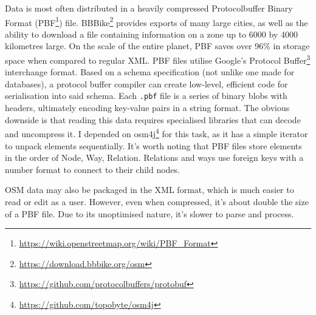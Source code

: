Data is most often distributed in a heavily compressed Protocolbuffer Binary Format (PBF\footnote{\url{https://wiki.openstreetmap.org/wiki/PBF_Format}}) file. BBBike\footnote{\url{https://download.bbbike.org/osm}} provides exports of many large cities, as well as the ability to download a file containing information on a zone up to 6000 by 4000 kilometres large. On the scale of the entire planet, PBF saves over 96\% in storage space when compared to regular XML. PBF files utilise Google's Protocol Buffer\footnote{\url{https://github.com/protocolbuffers/protobuf}} interchange format. Based on a schema specification (not unlike one made for databases), a protocol buffer compiler can create low-level, efficient code for serialisation into said schema. Each \verb|.pbf| file is a series of binary blobs with headers, ultimately encoding key-value pairs in a string format. The obvious downside is that reading this data requires specialised libraries that can decode and uncompress it. I depended on osm4j\footnote{\url{https://github.com/topobyte/osm4j}} for this task, as it has a simple iterator to unpack elements sequentially. It's worth noting that PBF files store elements in the order of Node, Way, Relation. Relations and ways use foreign keys with a number format to connect to their child nodes.

OSM data may also be packaged in the XML format, which is much easier to read or edit as a user. However, even when compressed, it's about double the size of a PBF file. Due to its unoptimised nature, it's slower to parse and process.